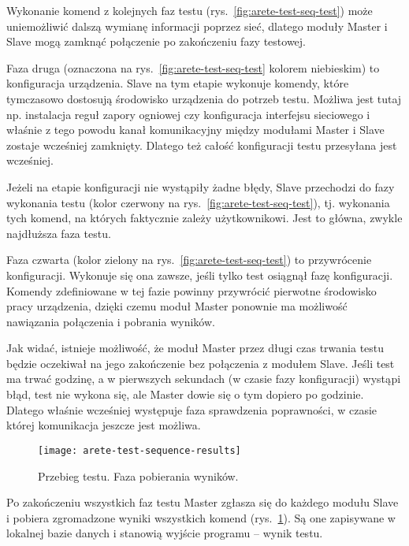 \documentclass[00-praca-magisterska.tex]{subfiles}
\begin{document}
Wykonanie komend z kolejnych faz testu (rys.~\ref{fig:arete-test-seq-test})
może uniemożliwić dalszą wymianę informacji poprzez sieć, dlatego moduły Master
i Slave mogą zamknąć połączenie po zakończeniu fazy testowej.

Faza druga (oznaczona na rys.~\ref{fig:arete-test-seq-test} kolorem niebieskim)
to konfiguracja urządzenia. Slave na tym etapie wykonuje komendy, które
tymczasowo dostosują środowisko urządzenia do potrzeb testu. Możliwa jest tutaj
np. instalacja reguł zapory ogniowej czy konfiguracja interfejsu sieciowego i
właśnie z tego powodu kanał komunikacyjny między modułami Master i Slave
zostaje wcześniej zamknięty. Dlatego też całość konfiguracji testu przesyłana
jest wcześniej.

Jeżeli na etapie konfiguracji nie wystąpiły żadne błędy, Slave przechodzi do
fazy wykonania testu (kolor czerwony na rys.~\ref{fig:arete-test-seq-test}), tj.
wykonania tych komend, na których faktycznie zależy użytkownikowi. Jest to
główna, zwykle najdłuższa faza testu.

Faza czwarta (kolor zielony na rys.~\ref{fig:arete-test-seq-test}) to
przywrócenie konfiguracji. Wykonuje się ona zawsze, jeśli tylko test osiągnął
fazę konfiguracji. Komendy zdefiniowane w tej fazie powinny przywrócić
pierwotne środowisko pracy urządzenia, dzięki czemu moduł Master ponownie ma
możliwość nawiązania połączenia i pobrania wyników.

Jak widać, istnieje możliwość, że moduł Master przez długi czas trwania testu
będzie oczekiwał na jego zakończenie bez połączenia z modułem Slave. Jeśli test
ma trwać godzinę, a w pierwszych sekundach (w czasie fazy konfiguracji) wystąpi
błąd, test nie wykona się, ale Master dowie się o tym dopiero po godzinie.
Dlatego właśnie wcześniej występuje faza sprawdzenia poprawności, w czasie
której komunikacja jeszcze jest możliwa.

\begin{figure}
\begin{center}
\leavevmode
\texttt{[image: arete-test-sequence-results]}
\end{center}
\caption{Przebieg testu. Faza pobierania wyników.}
\label{fig:arete-test-seq-results}
\end{figure}

Po zakończeniu wszystkich faz testu Master zgłasza się do każdego modułu Slave
i pobiera zgromadzone wyniki wszystkich komend
(rys.~\ref{fig:arete-test-seq-results}). Są one zapisywane w lokalnej bazie
danych i stanowią wyjście programu -- wynik testu.
\end{document}
